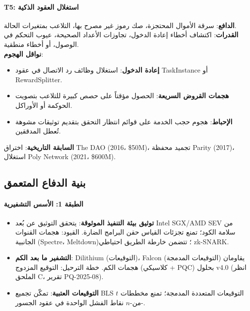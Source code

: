 \documentclass[11pt]{article}
\begin{document}
\paragraph{T5: استغلال العقود الذكية}
\textbf{الدافع}: سرقة الأموال المحتجزة، صك رموز غير مصرح بها، التلاعب بمتغيرات الحالة.\\
\textbf{القدرات}: اكتشاف أخطاء إعادة الدخول، تجاوزات الأعداد الصحيحة، عيوب التحكم في الوصول، أو أخطاء منطقية.\\
\textbf{نواقل الهجوم}:
\begin{itemize}[noitemsep]
  \item \textbf{إعادة الدخول}: استغلال وظائف رد الاتصال في عقود TaskInstance أو RewardSplitter.
  \item \textbf{هجمات القروض السريعة}: الحصول مؤقتاً على حصص كبيرة للتلاعب بتصويت الحوكمة أو الأوراكل.
  \item \textbf{الإحباط}: هجوم حجب الخدمة على قوائم انتظار التحقق بتقديم توثيقات مشوهة تُعطل المدققين.
\end{itemize}
\textbf{السابقة التاريخية}: اختراق The DAO (2016، \$50M)، تجميد محفظة Parity (2017)، استغلال Poly Network (2021، \$600M).

\subsection{بنية الدفاع المتعمق}

\paragraph{الطبقة 1: الأسس التشفيرية}
\begin{itemize}[noitemsep]
  \item \textbf{توثيق بيئة التنفيذ الموثوقة}: يتحقق التوثيق عن بُعد Intel SGX/AMD SEV من سلامة الكود؛ تمنع تجزئات القياس حقن البرامج الضارة. القيود: هجمات القنوات الجانبية (Spectre، Meltdown)؛ تتضمن خارطة الطريق احتياطي zk-SNARK.
  \item \textbf{التشفير ما بعد الكم}: Dilithium (التوقيعات)، Falcon (التوقيعات المدمجة) يقاومان هجمات الكم. خطة الترحيل: التوقيع المزدوج (كلاسيكي + PQC) بحلول v4.0 (انظر الملحق C، تقرير PQ-2025-08).
  \item \textbf{التوقيعات العتبية}: تمكّن تجميع BLS التوقيعات المتعددة المدمجة؛ تمنع مخططات $t$-من-$n$ نقاط الفشل الواحدة في عقود الجسور.
\end{itemize}
\end{document}
